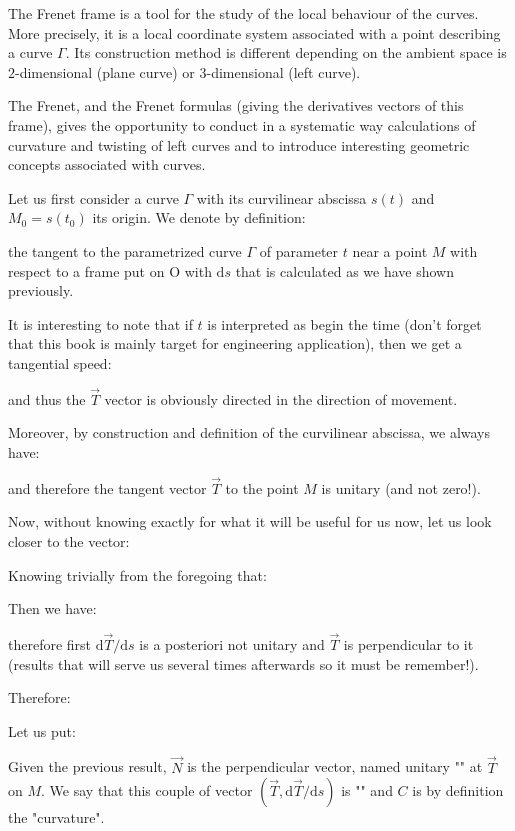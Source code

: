 {	The Frenet frame is a tool for the study of the local behaviour of the curves. More precisely, it is a local coordinate system associated with a point describing a curve $\Gamma$. Its construction method is different depending on the ambient space is $2$-dimensional (plane curve) or $3$-dimensional (left curve).
	
	The Frenet, and the Frenet formulas (giving the derivatives vectors of this frame), gives the opportunity to conduct in a systematic way calculations of curvature and twisting of left curves and to introduce interesting geometric concepts associated with curves.
	
	Let us first consider a curve $\Gamma$ with its curvilinear abscissa $s(t)$ and $M_0=s(t_0)$ its origin. We denote by definition:
	
	the tangent to the parametrized curve $\Gamma$ of parameter $t$ near a point $M$ with respect to a frame put on O with $\mathrm{d}s$ that is calculated as we have shown previously.
	
	It is interesting to note that if $t$ is interpreted as begin the time (don't forget that this book is mainly target for engineering application), then we get a tangential speed:
	
	and thus the  $\vec{T}$ vector is obviously directed in the direction of movement.
	
	Moreover, by construction and definition of the curvilinear abscissa, we always have:
	
	and therefore the tangent vector $\vec{T}$ to the point $M$ is unitary (and not zero!).
	
	Now, without knowing exactly for what it will be useful for us now, let us look closer to the vector:
	
	Knowing trivially from the foregoing that:
	
	Then we have:
	
	therefore first $\mathrm{d}\vec{T}/\mathrm{d}s$ is a posteriori not unitary and $\vec{T}$ is perpendicular to it (results that will serve us several times afterwards so it must be remember!).
	
	Therefore:
	
	
	Let us put:
	
	Given the previous result, $\vec{N}$ is the perpendicular vector, named unitary "" at $\vec{T}$ on $M$. We say that this couple of vector $\left(\vec{T},\mathrm{d}\vec{T}/\mathrm{d}s\right)$ is "" and $C$ is by definition the "curvature".
	
}
